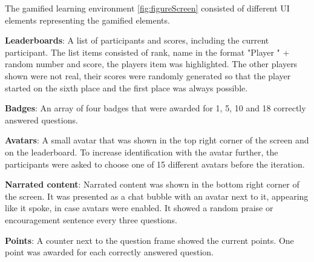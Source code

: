 The gamified learning environment \ref{fig:figureScreen} consisted of different UI elements representing the gamified elements.
\begin{APAitemize}
  \item \textbf{Leaderboards}: A list of participants and scores, including the current participant. The list items consisted of rank, name in the format "Player " + random number and score, the players item was highlighted. The other players shown were not real, their scores were randomly generated so that the player started on the sixth place and the first place was always possible.
  \item \textbf{Badges}: An array of four badges that were awarded for 1, 5, 10 and 18 correctly answered questions.
  \item \textbf{Avatars}: A small avatar that was shown in the top right corner of the screen and on the leaderboard. To increase identification with the avatar further, the participants were asked to choose one of 15 different avatars before the iteration.
  \item \textbf{Narrated content}: Narrated content was shown in the bottom right corner of the screen. It was presented as a chat bubble with an avatar next to it, appearing like it spoke, in case avatars were enabled. It showed a random praise or encouragement sentence every three questions.
  \item \textbf{Points}: A counter next to the question frame showed the current points. One point was awarded for each correctly answered question.
\end{APAitemize}

